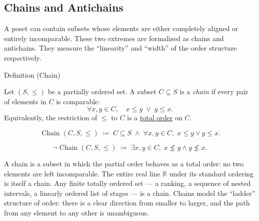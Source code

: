 
\subsection{Chains and Antichains}
\label{sec:chains-antichains}

\begin{remark*}
A poset can contain subsets whose elements are either completely aligned
or entirely incomparable.  These two extremes are formalised as chains and
antichains.  They measure the ``linearity'' and ``width'' of the order
structure respectively.
\end{remark*}


\begin{definitionbox}{Definition (Chain)}
\begin{definition}[Chain]
\label{def:lattice-chain}
Let $(S, \leq)$ be a partially ordered set.  A subset $C \subseteq S$ is a
\emph{chain} if every pair of elements in $C$ is comparable:
\[
\forall x, y \in C, \quad x \leq y \;\lor\; y \leq x.
\]
Equivalently, the restriction of $\leq$ to $C$ is a
\hyperref[def:lattice-order-total-order]{total order} on $C$.
\end{definition}
\end{definitionbox}

\begin{remark*}
\[
\operatorname{Chain}(C, S, \leq)
\;\coloneqq\;
C \subseteq S
\;\land\;
\forall x, y \in C,\; x \leq y \lor y \leq x.
\]
\end{remark*}

\begin{remark*}
\[
\neg\operatorname{Chain}(C, S, \leq)
\;\coloneqq\;
\exists x, y \in C,\; x \not\leq y \land y \not\leq x.
\]
\end{remark*}

\begin{remark*}[Interpretation]
A chain is a subset in which the partial order behaves as a total order:
no two elements are left incomparable.  The entire real line $\mathbb{R}$
under its standard ordering is itself a chain.  Any finite totally ordered
set --- a ranking, a sequence of nested intervals, a linearly ordered list
of stages --- is a chain.  Chains model the ``ladder'' structure of order:
there is a clear direction from smaller to larger, and the path from any
element to any other is unambiguous.
\end{remark*}

